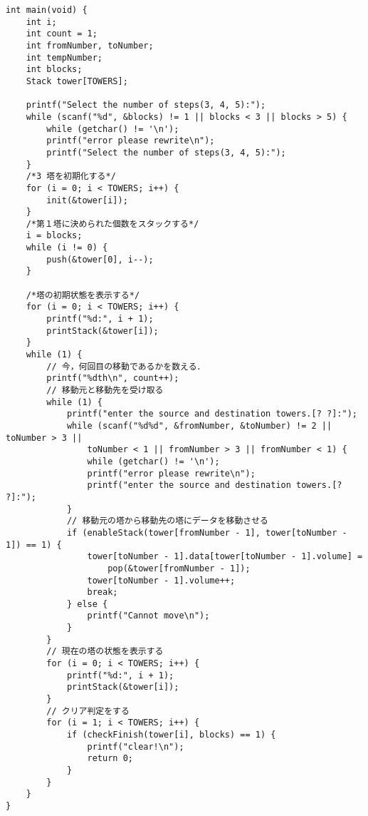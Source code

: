 \documentclass[a4j]{jarticle}
\begin{document}
\begin{lstlisting}[caption=ハノイの塔プログラム,label=towercode]
int main(void) {
    int i;
    int count = 1;
    int fromNumber, toNumber;
    int tempNumber;
    int blocks;
    Stack tower[TOWERS];

    printf("Select the number of steps(3, 4, 5):");
    while (scanf("%d", &blocks) != 1 || blocks < 3 || blocks > 5) {
        while (getchar() != '\n');
        printf("error please rewrite\n");
        printf("Select the number of steps(3, 4, 5):");
    }
    /*3 塔を初期化する*/
    for (i = 0; i < TOWERS; i++) {
        init(&tower[i]);
    }
    /*第１塔に決められた個数をスタックする*/
    i = blocks;
    while (i != 0) {
        push(&tower[0], i--);
    }

    /*塔の初期状態を表示する*/
    for (i = 0; i < TOWERS; i++) {
        printf("%d:", i + 1);
        printStack(&tower[i]);
    }
    while (1) {
        // 今，何回目の移動であるかを数える．
        printf("%dth\n", count++);
        // 移動元と移動先を受け取る
        while (1) {
            printf("enter the source and destination towers.[? ?]:");
            while (scanf("%d%d", &fromNumber, &toNumber) != 2 || toNumber > 3 ||
                toNumber < 1 || fromNumber > 3 || fromNumber < 1) {
                while (getchar() != '\n');
                printf("error please rewrite\n");
                printf("enter the source and destination towers.[? ?]:");
            }
            // 移動元の塔から移動先の塔にデータを移動させる
            if (enableStack(tower[fromNumber - 1], tower[toNumber - 1]) == 1) {
                tower[toNumber - 1].data[tower[toNumber - 1].volume] =
                    pop(&tower[fromNumber - 1]);
                tower[toNumber - 1].volume++;
                break;
            } else {
                printf("Cannot move\n");
            }
        }
        // 現在の塔の状態を表示する
        for (i = 0; i < TOWERS; i++) {
            printf("%d:", i + 1);
            printStack(&tower[i]);
        }
        // クリア判定をする
        for (i = 1; i < TOWERS; i++) {
            if (checkFinish(tower[i], blocks) == 1) {
                printf("clear!\n");
                return 0;
            }
        }
    }
}
\end{lstlisting}
\end{document}
